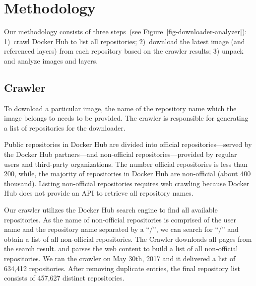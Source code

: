 \section{Methodology}
\label{sec:methodology}


Our methodology consists of three steps~(see Figure~\ref{fig-downloader-analyzer}):
1)~crawl Docker Hub to list all repositories;
2)~download the latest image (and referenced layers) from each repository based
on the crawler results; 3) unpack and analyze images and layers.



\subsection{Crawler}
\label{sec:crawler}

To download a particular image, %
the name of the repository name which the image belongs to needs to be provided.
The crawler is responsible for generating a list of repositories for the downloader.

Public repositories in Docker Hub are divided into official
repositories---served by the Docker Hub partners---and non-official
repositories---provided by regular users and third-party organizations.
%
The number official repositories is less than 200, while, the majority
of repositories in Docker Hub are non-official (about 400 thousand).
Listing non-official repositories requires web crawling because
Docker Hub does not provide an API to retrieve all repository names.

Our crawler utilizes the Docker Hub search engine to find all available
repositories.
%
As the name of non-official repositories is comprised
of the user name and the repository name separated by a ``/'', %
we can search for ``/'' and obtain a list of all non-official repositories.
The Crawler downloads all pages from the search result.
and parses the web content to build a list of all non-official repositories.
We ran the crawler on May 30th, 2017 and it delivered a list of 634,412 repositories.
%
%
After removing duplicate entries, the final repository list consists of 457,627
distinct repositories. 

